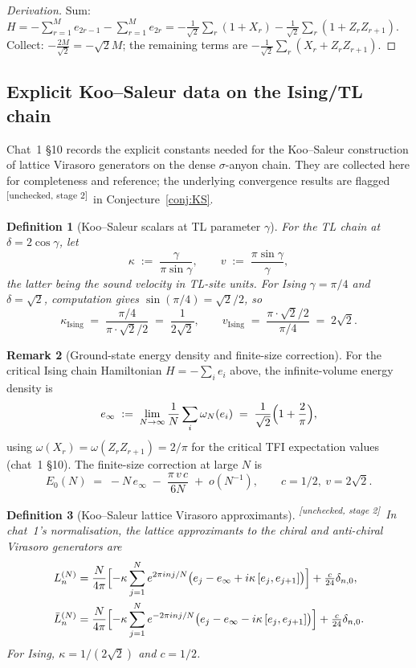 \documentclass[11pt,a4paper]{article}
\newtheorem{definition}{Definition}[section]
\theoremstyle{definition}
\newtheorem{remark}[definition]{Remark}
\newcommand{\unchecked}{\textsuperscript{\textcolor{red!70!black}{[unchecked, stage 2]}}}
\begin{document}
\begin{proof}[Derivation]
Sum: $H = -\sum_{r=1}^{M} e_{2r-1} - \sum_{r=1}^{M} e_{2r}
= -\tfrac{1}{\sqrt 2}\sum_r(1+X_r) - \tfrac{1}{\sqrt 2}\sum_r(1+Z_rZ_{r+1})$.
Collect: $-\tfrac{2M}{\sqrt 2} = -\sqrt 2 M$; the remaining terms are
$-\tfrac{1}{\sqrt 2}\sum_r(X_r+Z_rZ_{r+1})$.
\end{proof}

\subsection{Explicit Koo--Saleur data on the Ising/TL chain}\label{sec:KS-ising}

Chat~1 \S10 records the explicit constants needed for the Koo--Saleur
construction of lattice Virasoro generators on the dense $\sigma$-anyon
chain. They are collected here for completeness and reference; the
underlying convergence results are flagged \unchecked\ in
Conjecture~\ref{conj:KS}.

\begin{definition}[Koo--Saleur scalars at TL parameter $\gamma$]\label{def:KS-scalars}
For the TL chain at $\delta = 2\cos\gamma$, let
\[
\kappa \;:=\; \frac{\gamma}{\pi\sin\gamma}, \qquad
v \;:=\; \frac{\pi\sin\gamma}{\gamma},
\]
the latter being the sound velocity in TL-site units. For Ising
$\gamma = \pi/4$ and $\delta = \sqrt 2$, computation gives
$\sin(\pi/4) = \sqrt 2 / 2$, so
\[
\kappa_{\mathrm{Ising}} \;=\; \frac{\pi/4}{\pi\cdot \sqrt 2/2}
\;=\; \frac{1}{2\sqrt 2}, \qquad
v_{\mathrm{Ising}} \;=\; \frac{\pi\cdot\sqrt 2/2}{\pi/4} \;=\; 2\sqrt 2.
\]
\end{definition}

\begin{remark}[Ground-state energy density and finite-size correction]
For the critical Ising chain Hamiltonian $H = -\sum_i e_i$ above, the
infinite-volume energy density is
\[
e_\infty \;:=\; \lim_{N\to\infty}\frac{1}{N}\sum_i\omega_N(e_i)
\;=\; \frac{1}{\sqrt 2}\Bigl(1 + \frac{2}{\pi}\Bigr),
\]
using $\omega(X_r) = \omega(Z_r Z_{r+1}) = 2/\pi$ for the critical TFI
expectation values (chat~1 §10). The finite-size correction at large $N$ is
\[
E_0(N) \;=\; -N\,e_\infty \;-\; \frac{\pi\,v\,c}{6 N} \;+\; o(N^{-1}),
\qquad c = 1/2,\ v = 2\sqrt 2.
\]
\end{remark}

\begin{definition}[Koo--Saleur lattice Virasoro approximants]\label{def:KS-Ln}
\unchecked\ In chat~1's normalisation, the lattice approximants to the
chiral and anti-chiral Virasoro generators are
\begin{align*}
L_n^{(N)} &= \frac{N}{4\pi}\Bigl[-\kappa\sum_{j=1}^{N}e^{2\pi i n j/N}\bigl(e_j - e_\infty
                + i\kappa\,[e_j, e_{j+1}]\bigr)\Bigr] + \tfrac{c}{24}\delta_{n,0},\\
\bar L_n^{(N)} &= \frac{N}{4\pi}\Bigl[-\kappa\sum_{j=1}^{N}e^{-2\pi i n j/N}\bigl(e_j - e_\infty
                - i\kappa\,[e_j, e_{j+1}]\bigr)\Bigr] + \tfrac{c}{24}\delta_{n,0}.
\end{align*}
For Ising, $\kappa = 1/(2\sqrt 2)$ and $c = 1/2$.
\end{definition}
\end{document}

